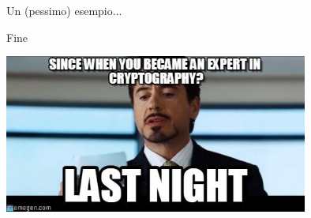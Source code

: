 \documentclass[handout, xcolor=dvipsnames,aspectratio=169]{beamer}
\begin{document}
\begin{frame}{Un (pessimo) esempio...}
    \pause

  \begin{figure}%
    \centering
  \pause
    \qquad
  \end{figure}

\end{frame}
\begin{frame}{Fine}

\centering\includegraphics[width=10cm]{img/expert}


\end{frame}
\end{document}
